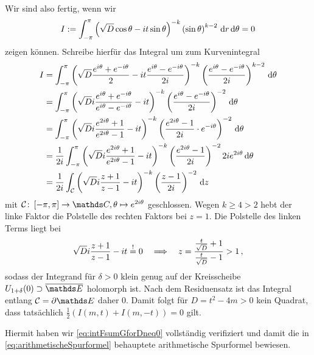 \begin{bewe}
Wir sind also fertig, wenn wir
\[
	I := \int_{-\pi}^\pi \left( \sqrt{D} \cos \theta - it \sin \theta \right)^{-k} \left( \sin \theta \right)^{k-2} \,\mathrm{d} r \,\mathrm{d} \theta = 0
\]
zeigen können. Schreibe hierfür das Integral um zum Kurvenintegral
\begin{align*}
	I
	&= \int_{-\pi}^{\pi} \left( \sqrt D \frac {e^{i\theta} + e^{-i\theta}}2 - it \frac {e^{i\theta} - e^{-i\theta}}{2i} \right)^{-k} \left( \frac {e^{i\theta} - e^{-i\theta}}{2i} \right)^{k-2} \,\mathrm{d} \theta \\
	&= \int_{-\pi}^{\pi} \left( \sqrt D i \frac {e^{i\theta} + e^{-i\theta}}{e^{i\theta} - e^{-i\theta}} - it \right)^{-k} \left( \frac {e^{i\theta} - e^{-i\theta}}{2i} \right)^{-2} \,\mathrm{d} \theta \\
	&= \int_{-\pi}^{\pi} \left( \sqrt D i \frac {e^{2i\theta} + 1}{e^{2i\theta} - 1} - it \right)^{-k} \left( \frac {e^{2i\theta} - 1}{2i} \cdot e^{-i\theta} \right)^{-2} \,\mathrm{d} \theta \\
	&= \frac 1{2i} \int_{-\pi}^{\pi} \left( \sqrt D i \frac {e^{2i\theta} + 1}{e^{2i\theta} - 1} - it \right)^{-k} \left( \frac {e^{2i\theta} - 1}{2i} \right)^{-2} 2ie^{2i\theta} \,\mathrm{d} \theta \\
	&= \frac 1{2i} \int_{\mathcal C} \left( \sqrt D i \frac {z+1}{z-1} - it \right)^{-k} \left( \frac{z-1}{2i} \right)^{-2} \,\mathrm{d} z
\end{align*}
mit $\mathcal C \colon \left[ -\pi, \pi \right] \to \CC, \theta \mapsto e^{2i\theta}$ geschlossen. Wegen $k \geq 4 > 2$ hebt der linke Faktor die Polstelle des rechten Faktors bei $z = 1$. Die Polstelle des linken Terms liegt bei
\[
	\sqrt D i \frac{z+1}{z-1} - it \overset != 0 \quad \Longrightarrow \quad z = \frac {\frac t{\sqrt{D}} + 1}{\frac t{\sqrt{D}} - 1} > 1
	\,,
\]
sodass der Integrand für $\delta > 0$ klein genug auf der Kreisscheibe $U_{1 + \delta}(0) \supset \closure \EE$ holomorph ist. Nach dem Residuensatz ist das Integral entlang $\mathcal C = \partial \EE$ daher $0$. Damit folgt für $D = t^2 - 4m > 0$ kein Quadrat, dass tatsächlich $\frac 12 \left( I(m,t) + I(m,-t) \right) = 0$ gilt.

Hiermit haben wir \eqref{eq:intFsumGforDneq0} vollständig verifiziert und damit die in \eqref{eq:arithmetischeSpurformel} behauptete arithmetische Spurformel bewiesen.

\end{bewe}